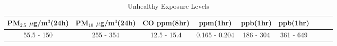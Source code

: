 \begin{table}[H]
\centering\scriptsize
\caption{Unhealthy Exposure Levels \cite{aqi-technical-doc}}
\begin{tabular}{|c|c|c|c|c|c|c|c|c|}
\hline
	PM$_{2.5}$ $\mu$g/m$^3$(24h) & PM$_{10}$ $\mu$g/m$^3$(24h) & CO ppm(8hr) &
	\ozone ppm(1hr) & \sdo ppb(1hr) & \ndo ppb(1hr) \\ 
\hline

	55.5 - 150  & 255 - 354 & 12.5 - 15.4 & 0.165 - 0.204 & 186 - 304 & 361 - 649 \\\hline

\end{tabular}
\label{tab:gasUnhealthyExposure}
\end{table}

